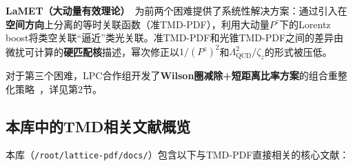 \documentclass[12pt,a4paper]{ctexart}
\theoremstyle{definition}
\begin{document}
\textbf{LaMET（大动量有效理论）}~\cite{Ji2013Euclidean,Ji2014LaMET}为前两个困难提供了系统性解决方案：通过引入在\textbf{空间方向}上分离的等时关联函数（准TMD-PDF），利用大动量$P^z$下的Lorentz boost将类空关联``逼近''类光关联。准TMD-PDF和光锥TMD-PDF之间的差异由微扰可计算的\textbf{硬匹配核}描述，幂次修正以$1/(P^z)^2$和$\Lambda_{\text{QCD}}^2/\zeta_z$的形式被压低。

对于第三个困难，LPC合作组开发了\textbf{Wilson圈减除+短距离比率方案}的组合重整化策略~\cite{Zhang2022renormTMD}，详见第2节。

\subsection{本库中的TMD相关文献概览}

本库（\texttt{/root/lattice-pdf/docs/}）包含以下与TMD-PDF直接相关的核心文献：
\end{document}
